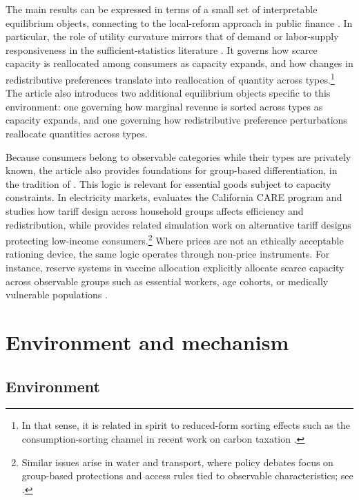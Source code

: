 \documentclass{class}
\begin{document}
The main results can be expressed in terms of a small set of interpretable equilibrium objects, connecting to the local-reform approach in public finance \citep{Saez2001}. In particular, the role of utility curvature mirrors that of demand or labor-supply responsiveness in the sufficient-statistics literature \citep{Chetty2010,Kleven2021}. It governs how scarce capacity is reallocated among consumers as capacity expands, and how changes in redistributive preferences translate into reallocation of quantity across types.\footnote{In that sense, it is related in spirit to reduced-form sorting effects such as the consumption-sorting channel in recent work on carbon taxation \citep{Bierbrauer2024,Gse2024}.} The article also introduces two additional equilibrium objects specific to this environment: one governing how marginal revenue is sorted across types as capacity expands, and one governing how redistributive preference perturbations reallocate quantities across types.

Because consumers belong to observable categories while their types are privately known, the article also provides foundations for group-based differentiation, in the tradition of \citep{Akerlof1978,Cremer2002}. This logic is relevant for essential goods subject to capacity constraints. In electricity markets, \citep{Borenstein2012} evaluates the California CARE program and studies how tariff design across household groups affects efficiency and redistribution, while \citet{Burger2020} provides related simulation work on alternative tariff designs protecting low-income consumers.\footnote{Similar issues arise in water and transport, where policy debates focus on group-based protections and access rules tied to observable characteristics; see \citep{HjortX.;Leflaive2020,Manville2022}.} Where prices are not an ethically acceptable rationing device, the same logic operates through non-price instruments. For instance, reserve systems in vaccine allocation explicitly allocate scarce capacity across observable groups such as essential workers, age cohorts, or medically vulnerable populations \citep{akbarpour2023economic,Pathak2024}. 



\section{Environment and mechanism}\label{sec2}

\subsection{Environment}
\end{document}
